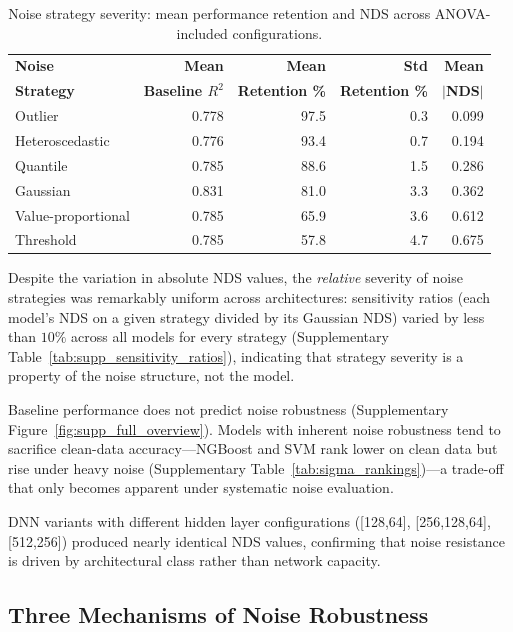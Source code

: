 \documentclass[pdflatex,sn-mathphys-num]{sn-jnl}%
\theoremstyle{thmstyleone}%
\theoremstyle{thmstyletwo}%
\theoremstyle{thmstylethree}%
\begin{document}
\begin{table}[htbp]
\centering
\caption{Noise strategy severity: mean performance retention and NDS across ANOVA-included configurations.}
\label{tab:phase5_noise_strategy}
\small
\begin{tabular}{lrrrr}
\toprule
\textbf{Noise} & \textbf{Mean} & \textbf{Mean} & \textbf{Std} & \textbf{Mean} \\
\textbf{Strategy} & \textbf{Baseline $R^2$} & \textbf{Retention \%} & \textbf{Retention \%} & \textbf{$|$NDS$|$} \\
\midrule
Outlier & 0.778 & 97.5 & 0.3 & 0.099 \\
Heteroscedastic & 0.776 & 93.4 & 0.7 & 0.194 \\
Quantile & 0.785 & 88.6 & 1.5 & 0.286 \\
Gaussian & 0.831 & 81.0 & 3.3 & 0.362 \\
Value-proportional & 0.785 & 65.9 & 3.6 & 0.612 \\
Threshold & 0.785 & 57.8 & 4.7 & 0.675 \\
\bottomrule
\end{tabular}
\end{table}

Despite the variation in absolute NDS values, the \emph{relative} severity of noise strategies was remarkably uniform across architectures: sensitivity ratios (each model's NDS on a given strategy divided by its Gaussian NDS) varied by less than $10\%$ across all models for every strategy (Supplementary Table~\ref{tab:supp_sensitivity_ratios}), indicating that strategy severity is a property of the noise structure, not the model.

Baseline performance does not predict noise robustness (Supplementary Figure~\ref{fig:supp_full_overview}). Models with inherent noise robustness tend to sacrifice clean-data accuracy---NGBoost and SVM rank lower on clean data but rise under heavy noise (Supplementary Table~\ref{tab:sigma_rankings})---a trade-off that only becomes apparent under systematic noise evaluation.

DNN variants with different hidden layer configurations ([128,64], [256,128,64], [512,256]) produced nearly identical NDS values, confirming that noise resistance is driven by architectural class rather than network capacity.

\subsection{Three Mechanisms of Noise Robustness}\label{sec:mechanisms}
\end{document}
